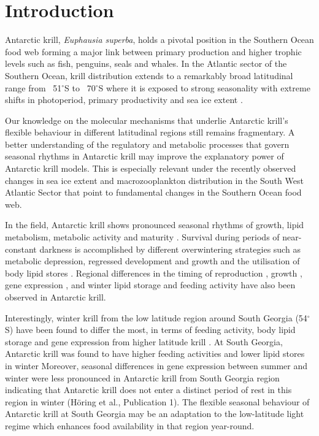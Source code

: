 \section{Introduction}

Antarctic krill, \textit{Euphausia superba}, holds a pivotal position in the
Southern Ocean food web forming a major link between primary production and
higher trophic levels such as fish, penguins, seals and whales. In the Atlantic
sector of the Southern Ocean, krill distribution extends to a remarkably broad
latitudinal range from ~51$^{\circ}$S to ~70$^{\circ}$S where it is exposed to
strong seasonality with extreme shifts in photoperiod, primary productivity and
sea ice extent \citep{quetin_behavioral_1991}.

Our knowledge on the molecular mechanisms that underlie Antarctic krill's
flexible behaviour in different latitudinal regions still remains fragmentary.
A better understanding of the regulatory and metabolic processes that govern
seasonal rhythms in Antarctic krill may improve the explanatory power of
Antarctic krill models. This is especially relevant under the recently observed
changes in sea ice extent and macrozooplankton distribution in the South West
Atlantic Sector \citep{atkinson_sardine_2014, atkinson_krill_2019,
steinberg_long-term_2015} that point to fundamental changes in the Southern
Ocean food web.

In the field, Antarctic krill shows pronounced seasonal rhythms of growth,
lipid metabolism, metabolic activity and maturity \citep{kawaguchi_krill_2007,
meyer_seasonal_2010}. Survival during periods of near-constant darkness is
accomplished by different overwintering strategies such as metabolic
depression, regressed development and growth and the utilisation of body lipid
stores \citep{meyer_overwintering_2012}. Regional differences in the timing of
reproduction \citep{spiridonov_spatial_1995}, growth
\citep{kawaguchi_modelling_2006}, gene expression \citep{seear_seasonal_2012},
and winter lipid storage and feeding activity \citep{schmidt_feeding_2014} have
also been observed in Antarctic krill.

Interestingly, winter krill from the low latitude region around South Georgia
(54$^{\circ}$S) have been found to differ the most, in terms of feeding
activity, body lipid storage and gene expression from higher latitude krill
\citep[and H{\"o}ring et al., in prep(Publication 1)]{schmidt_feeding_2014}. At
South Georgia, Antarctic krill was found to have higher feeding activities and
lower lipid stores in winter \citep{schmidt_feeding_2014, seear_seasonal_2012}
Moreover, seasonal differences in gene expression between summer and winter
were less pronounced in Antarctic krill from South Georgia region indicating
that Antarctic krill does not enter a distinct period of rest in this region in
winter (Höring et al., Publication 1). The flexible seasonal behaviour of Antarctic
krill at South Georgia may be an adaptation to the low-latitude light regime
which enhances food availability in that region year-round.

